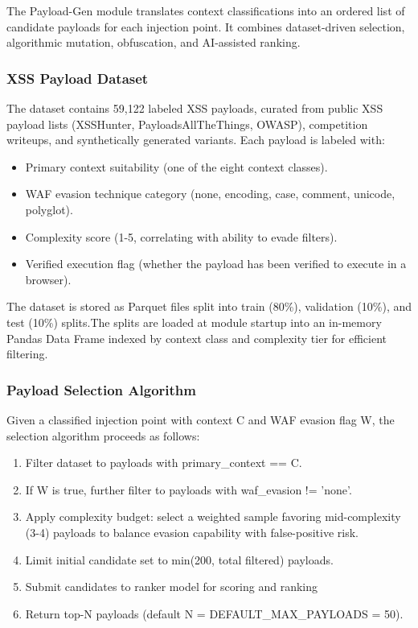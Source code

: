 The Payload-Gen module translates context classifications into an ordered list of candidate payloads for each injection point. It combines dataset-driven selection, algorithmic mutation, obfuscation, and AI-assisted ranking.

\subsubsection{XSS Payload Dataset}

The dataset contains 59,122 labeled XSS payloads, curated from public XSS payload lists (XSSHunter, PayloadsAllTheThings, OWASP), competition writeups, and synthetically generated variants. Each payload is labeled with:

\begin{itemize}
    \item Primary context suitability (one of the eight context classes).
    \item WAF evasion technique category (none, encoding, case, comment, unicode, polyglot). 
    \item Complexity score (1-5, correlating with ability to evade filters).
    \item Verified execution flag (whether the payload has been verified to execute in a browser).
\end{itemize}

The dataset is stored as Parquet files split into train (80\%), validation (10\%), and test (10\%) splits.The splits are loaded at module startup into an in-memory Pandas Data Frame indexed by context class and complexity tier for efficient filtering.

\subsubsection{Payload Selection Algorithm}

Given a classified injection point with context C and WAF evasion flag W, the selection algorithm proceeds as follows:

\begin{enumerate}
    \item  Filter dataset to payloads with primary\_\allowbreak context == C.
    \item  If W is true, further filter to payloads with waf\_\allowbreak evasion != 'none'.
    \item Apply complexity budget: select a weighted sample favoring mid-complexity (3-4) payloads to balance evasion capability with false-positive risk.
    \item Limit initial candidate set to min(200, total filtered) payloads.
    \item  Submit candidates to ranker model for scoring and ranking
    \item Return top-N payloads (default N = DEFAULT\_\allowbreak MAX\_\allowbreak PAYLOADS = 50).
\end{enumerate}

